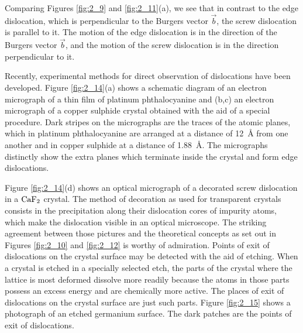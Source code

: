 Comparing Figures \ref{fig:2_9} and \ref{fig:2_11}(a), we see that in contrast to the edge dislocation, which is perpendicular to the Burgers vector $\vec{b}$, the screw dislocation is parallel to it. The motion of the edge dislocation is in the direction of the Burgers vector $\vec{b}$, and the motion of the screw dislocation is in the direction perpendicular to it.

Recently, experimental methods for direct observation of dislocations have been developed. Figure \ref{fig:2_14}(a) shows a schematic diagram of an electron micrograph of a thin film of platinum phthalocyanine and (b,c) an electron micrograph of a copper sulphide crystal obtained with the aid of a special procedure. Dark stripes on the micrographs are the traces of the atomic planes, which in platinum phthalocyanine are arranged at a distance of \SI{12}{\angstrom} from one another and in copper sulphide at a distance of \SI{1.88}{\angstrom}. The
micrographs distinctly show the extra planes which terminate inside the crystal and form edge dislocations.

Figure \ref{fig:2_14}(d) shows an optical micrograph of a decorated screw dislocation in a $\ce{CaF2}$ crystal. The method of decoration as used for transparent crystals consists in the precipitation along their dislocation cores of impurity atoms, which make the dislocation visible in an optical microscope. The striking agreement between those pictures and the theoretical concepts as set out in Figures \ref{fig:2_10} and \ref{fig:2_12} is worthy of admiration. Points of exit of dislocations on the crystal surface may be detected with the aid of etching. When a crystal is etched in a specially selected etch, the parts of the crystal where the lattice is most deformed dissolve more readily because the atoms in those parts possess an excess energy and are chemically more active. The places of exit of dislocations on the crystal surface are just such parts. Figure \ref{fig:2_15} shows a photograph of an etched germanium surface. The dark patches are the points of exit of dislocations.

